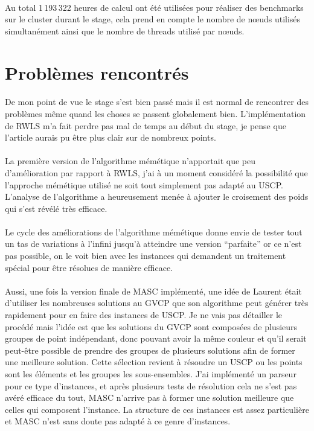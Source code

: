 \documentclass[a4paper,11pt,twoside,french,report]{../common/simplem}
\begin{document}
			\paragraph*{}
				Au total 1\,193\,322 heures de calcul ont été utilisées pour réaliser des benchmarks sur le cluster durant le stage, cela prend en compte le nombre de nœuds utilisés simultanément ainsi que le nombre de threads utilisé par nœuds.
		\section{Problèmes rencontrés}
			\paragraph*{}
				De mon point de vue le stage s'est bien passé mais il est normal de rencontrer des problèmes même quand les choses se passent globalement bien. L'implémentation de \gls{RWLS} m'a fait perdre pas mal de temps au début du stage, je pense que l'article \cite{Gao2015} aurais pu être plus clair sur de nombreux points.
			\paragraph*{}
				La première version de l'algorithme mémétique n'apportait que peu d'amélioration par rapport à \gls{RWLS}, j'ai à un moment considéré la possibilité que l'approche mémétique utilisé ne soit tout simplement pas adapté au \gls{USCP}. L'analyse de l'algorithme a heureusement menée à ajouter le croisement des poids qui s'est révélé très efficace.
			\paragraph*{}
				Le cycle des améliorations de l'algorithme mémétique donne envie de tester tout un tas de variations à l'infini jusqu'à atteindre une version ``parfaite'' or ce n'est pas possible, on le voit bien avec les instances  qui demandent un traitement spécial pour être résolues de manière efficace.
			\paragraph*{}
				Aussi, une fois la version finale de \gls{MASC} implémenté, une idée de Laurent était d'utiliser les nombreuses solutions au \gls{GVCP} que son algorithme peut générer très rapidement pour en faire des instances de \gls{USCP}. Je ne vais pas détailler le procédé mais l'idée est que les solutions du \gls{GVCP} sont composées de plusieurs groupes de point indépendant, donc pouvant avoir la même couleur et qu'il serait peut-être possible de prendre des groupes de plusieurs solutions afin de former une meilleure solution. Cette sélection revient à résoudre un \gls{USCP} ou les points sont les éléments et les groupes les sous-ensembles. J'ai implémenté un parseur pour ce type d'instances, et après plusieurs tests de résolution cela ne s'est pas avéré efficace du tout, \gls{MASC} n'arrive pas à former une solution meilleure que celles qui composent l'instance. La structure de ces instances est assez particulière et \gls{MASC} n'est sans doute pas adapté à ce genre d'instances.
\end{document}
